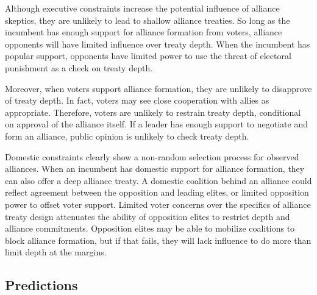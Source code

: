 \documentclass[12pt]{article}
\begin{document}
Although executive constraints increase the potential influence of alliance skeptics, they are unlikely to lead to shallow alliance treaties. 
So long as the incumbent has enough support for alliance formation from voters, alliance opponents will have limited influence over treaty depth. 
When the incumbent has popular support, opponents have limited power to use the threat of electoral punishment as a check on treaty depth. 




Moreover, when voters support alliance formation, they are unlikely to disapprove of treaty depth.
In fact, voters may see close cooperation with allies as appropriate. 
Therefore, voters are unlikely to restrain treaty depth, conditional on approval of the alliance itself. 
If a leader has enough support to negotiate and form an alliance, public opinion is unlikely to check treaty depth. 


Domestic constraints clearly show a non-random selection process for observed alliances. 
When an incumbent has domestic support for alliance formation, they can also offer a deep alliance treaty. 
A domestic coalition behind an alliance could reflect agreement between the opposition and leading elites, or limited opposition power to offset voter support. 
Limited voter concerns over the specifics of alliance treaty design attenuates the ability of opposition elites to restrict depth and alliance commitments.
Opposition elites may be able to mobilize coalitions to block alliance formation, but if that fails, they will lack influence to do more than limit depth at the margins. 



\subsection{Predictions}
\end{document}
